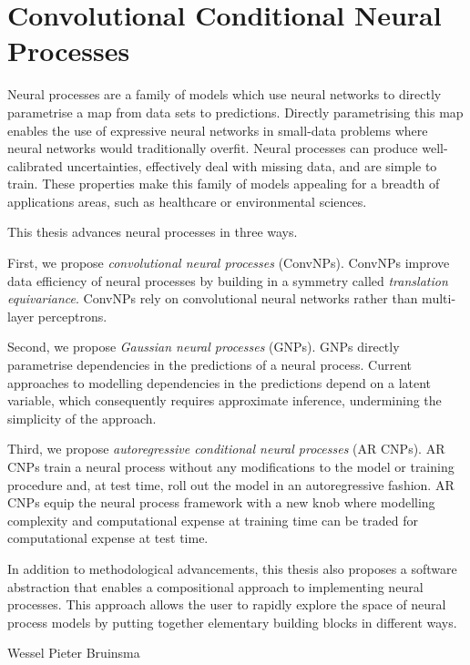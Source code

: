 \documentclass[12pt]{report}
\begin{document}
\chapter*{Convolutional Conditional \newline Neural Processes}

Neural processes are a family of models which use neural networks to directly parametrise a  map from data sets to predictions.
Directly parametrising this map enables the use of expressive neural networks in small-data problems where neural networks would traditionally overfit.
Neural processes
can produce well-calibrated uncertainties,
effectively deal with missing data,
and are simple to train.
These properties make this family of models appealing for a breadth of applications areas, such as healthcare or environmental sciences.

This thesis advances neural processes in three ways.

First, we propose \emph{convolutional neural processes} (ConvNPs).
ConvNPs improve data efficiency of neural processes by building in a symmetry called \emph{translation equivariance}.
ConvNPs rely on convolutional neural networks rather than multi-layer perceptrons.

Second, we propose \emph{Gaussian neural processes} (GNPs).
GNPs directly parametrise dependencies in the predictions of a neural process.
Current approaches to modelling dependencies in the predictions depend on a latent variable, which consequently requires approximate inference, undermining the simplicity of the approach.

Third, we propose \emph{autoregressive conditional neural processes} (AR CNPs).
AR CNPs train a neural process without any modifications to the model or training procedure and, at test time, roll out the model in an autoregressive fashion.
AR CNPs equip the neural process framework with a new knob where modelling complexity and computational expense at training time can be traded for computational expense at test time.

In addition to methodological advancements, this thesis also proposes a software abstraction that enables a compositional approach to implementing neural processes.
This approach allows the user to rapidly explore the space of neural process models by putting together elementary building blocks in different ways.

\raggedleft
Wessel Pieter Bruinsma
\end{document}
